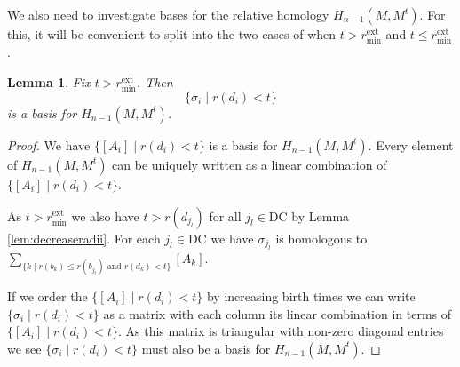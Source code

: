 \documentclass[a4paper,11pt]{article}
\newtheorem{lemma}[theorem]{Lemma}
\theoremstyle{definition}
\newcommand{\DC}{\text{DC}}
\newcommand{\ext}{\text{ext}}
\begin{document}
We also need to investigate bases for the relative homology $H_{n-1}(M, M^t)$. For this, it will be convenient to split into the two cases of when $t>r_{\min}^{\ext}$ and $t\leq r_{\min}^{\ext}$.

\begin{lemma}\label{lem:relativebasisbig}
Fix $t>r_{\min}^{\ext}$. Then $$\{\sigma_i \mid r(d_i)< t\}$$ is a basis for $H_{n-1}(M, M^t)$.
\end{lemma}    
\begin{proof}
We have $\{[A_i] \mid r(d_i)< t\}$ is a basis for $H_{n-1}(M, M^t)$. Every element of $H_{n-1}(M, M^t)$ can be uniquely written as a linear combination of $\{[A_i] \mid r(d_i)< t\}$.

As $t>r_{\min}^{\ext}$ we also have $t>r(d_{j_l})$ for all $j_l\in \DC$ by Lemma \ref{lem:decreaseradii}. For each $j_l\in \DC$ we have $\sigma_{j_l}$ is homologous to $\sum_{\{k\mid r(b_k)\leq r(b_{j_l}) \text{ and } r(d_k)< t\}}[A_k]$.

If we order the $\{[A_i] \mid r(d_i)< t\}$ by increasing birth times we can write $\{\sigma_i \mid r(d_i)< t\}$ as a matrix with each column its linear combination in terms of $\{[A_i] \mid r(d_i)< t\}$. As this matrix is triangular with non-zero diagonal entries we see $\{\sigma_i \mid r(d_i)< t\}$ must also be a basis for $H_{n-1}(M, M^t)$.
\end{proof}
\end{document}

